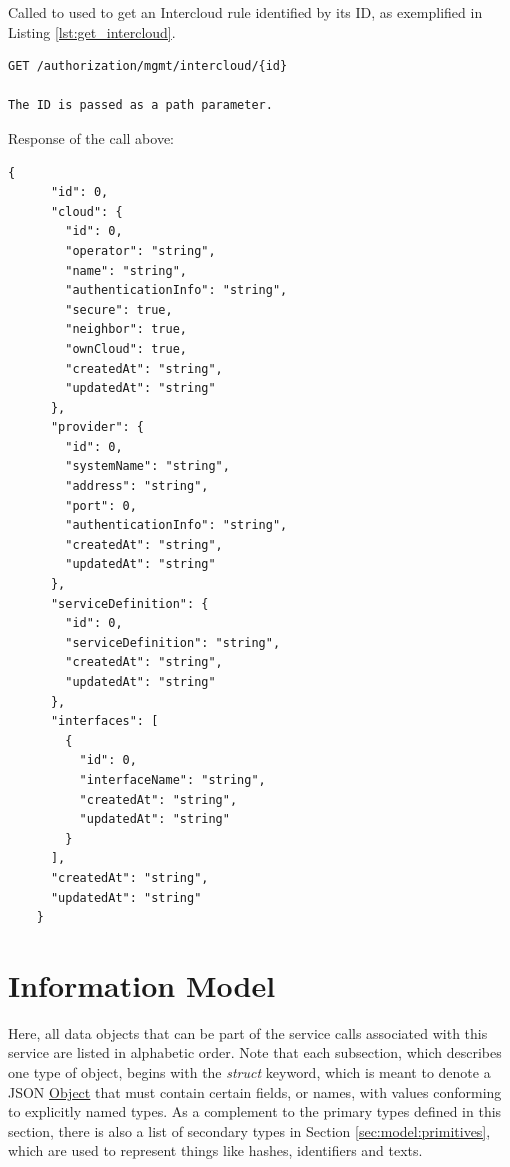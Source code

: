 \documentclass[a4paper]{arrowhead}
\newcommand{\fref}[1]{{\textcolor{ArrowheadBlue}{\hyperref[sec:functions:#1]{#1}}}}
\newcommand{\pref}[1]{{\textcolor{ArrowheadGrey}{\hyperref[sec:model:primitives:#1]{#1}}}}
\begin{document}

Called to used to get an Intercloud rule identified by its ID, as exemplified in Listing \ref{lst:get_intercloud}.

\begin{lstlisting}[language=http,label={lst:get_intercloud_id},caption={A \fref{Get an Intercloud rule by ID} invocation.}]
GET /authorization/mgmt/intercloud/{id}

The ID is passed as a path parameter.
\end{lstlisting}

Response of the call above:

\begin{lstlisting}[language=http,label={lst:get_intercloud_id_res},caption={A \fref{Get an Intercloud rule by ID} response is an InterCloudRule}]
{
      "id": 0,
      "cloud": {
        "id": 0,
        "operator": "string",
        "name": "string",
        "authenticationInfo": "string",
        "secure": true,
        "neighbor": true,
        "ownCloud": true,
        "createdAt": "string",
        "updatedAt": "string"
      },
      "provider": {
        "id": 0,
        "systemName": "string",
        "address": "string",
        "port": 0,
        "authenticationInfo": "string",
        "createdAt": "string",
        "updatedAt": "string"
      },
      "serviceDefinition": {
        "id": 0,
        "serviceDefinition": "string",
        "createdAt": "string",
        "updatedAt": "string"
      },
      "interfaces": [
        {
          "id": 0,
          "interfaceName": "string",
          "createdAt": "string",
          "updatedAt": "string"
        }
      ],
      "createdAt": "string",
      "updatedAt": "string"
    }
\end{lstlisting}

\newpage

\section{Information Model}
\label{sec:model}

Here, all data objects that can be part of the service calls associated with this service are listed in alphabetic order.
Note that each subsection, which describes one type of object, begins with the \textit{struct} keyword, which is meant to denote a JSON \pref{Object} that must contain certain fields, or names, with values conforming to explicitly named types.
As a complement to the primary types defined in this section, there is also a list of secondary types in Section \ref{sec:model:primitives}, which are used to represent things like hashes, identifiers and texts.
\end{document}
